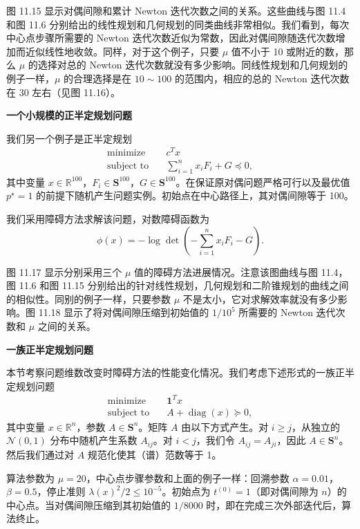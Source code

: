 \documentclass[UTF8, 12pt, fontset=fandol, oneside]{ctexart}
\begin{document}
图 11.15 显示对偶间隙和累计 Newton 迭代次数之间的关系。这些曲线与图 11.4 和图 11.6 分别给出的线性规划和几何规划的同类曲线非常相似。我们看到，每次中心点步骤所需要的 Newton 迭代次数近似为常数，因此对偶间隙随迭代次数增加而近似线性地收敛。同样，对于这个例子，只要 $\mu$ 值不小于 10 或附近的数，那么 $\mu$ 的选择对总的 Newton 迭代次数就没有多少影响。同线性规划和几何规划的例子一样，$\mu$ 的合理选择是在 $10\sim 100$ 的范围内，相应的总的 Newton 迭代次数在 30 左右（见图 11.16）。

\noindent\textbf{一个小规模的正半定规划问题}

我们另一个例子是正半定规划
\begin{equation}
\begin{aligned}
\text{minimize}\quad & c^Tx\\
\text{subject to}\quad & \sum_{i=1}^n x_iF_i+G\preceq 0,
\end{aligned}
\tag{11.46}
\end{equation}
其中变量 $x\in\mathbb{R}^{100}$，$F_i\in\mathbf{S}^{100}$，$G\in\mathbf{S}^{100}$。在保证原对偶问题严格可行以及最优值 $p^\star=1$ 的前提下随机产生问题实例。初始点在中心路径上，其对偶间隙等于 100。

我们采用障碍方法求解该问题，对数障碍函数为
\[
\phi(x)=-\log\det\left(-\sum_{i=1}^n x_iF_i-G\right).
\]

图 11.17 显示分别采用三个 $\mu$ 值的障碍方法进展情况。注意该图曲线与图 11.4，图 11.6 和图 11.15 分别给出的针对线性规划，几何规划和二阶锥规划的曲线之间的相似性。同别的例子一样，只要参数 $\mu$ 不是太小，它对求解效率就没有多少影响。图 11.18 显示了将对偶间隙压缩到初始值的 $1/10^5$ 所需要的 Newton 迭代次数和 $\mu$ 之间的关系。

\noindent\textbf{一族正半定规划问题}

本节考察问题维数改变时障碍方法的性能变化情况。我们考虑下述形式的一族正半定规划问题
\begin{equation}
\begin{aligned}
\text{minimize}\quad & \mathbf{1}^Tx\\
\text{subject to}\quad & A+\operatorname{diag}(x)\succeq 0,
\end{aligned}
\tag{11.47}
\end{equation}
其中变量 $x\in\mathbb{R}^n$，参数 $A\in\mathbf{S}^n$。矩阵 $A$ 由以下方式产生。对 $i\geq j$，从独立的 $\mathcal{N}(0,1)$ 分布中随机产生系数 $A_{ij}$。对 $i<j$，我们令 $A_{ij}=A_{ji}$，因此 $A\in\mathbf{S}^n$。然后我们通过对 $A$ 规范化使其（谱）范数等于 1。

算法参数为 $\mu=20$，中心点步骤参数和上面的例子一样：回溯参数 $\alpha=0.01$，$\beta=0.5$，停止准则 $\lambda(x)^2/2\leq 10^{-5}$。初始点为 $t^{(0)}=1$（即对偶间隙为 $n$）的中心点。当对偶间隙压缩到其初始值的 $1/8000$ 时，即在完成三次外部迭代后，算法终止。
\end{document}
